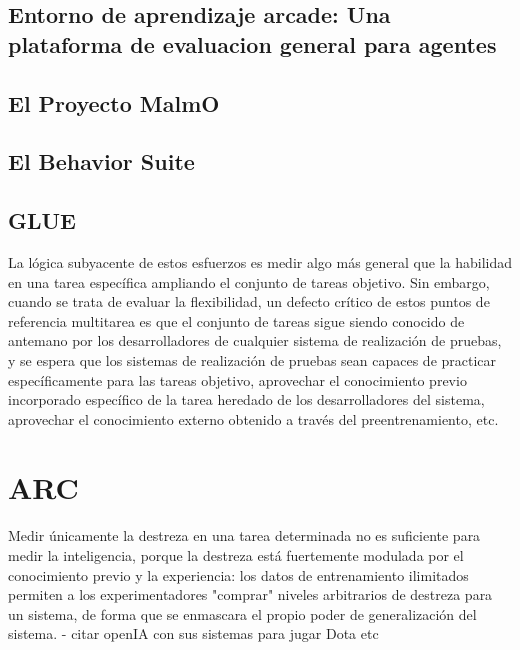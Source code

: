 \subsection{Entorno de aprendizaje arcade:
Una plataforma de evaluacion general para agentes}\label{subsection:state-of-the-art:evaluation-enviroments-with-know-tasks:arcade-enviroment}

\subsection{El Proyecto MalmO}\label{subsection:state-of-the-art:evaluation-enviroments-with-know-tasks:project-malmO}

\subsection{El Behavior Suite}\label{subsection:state-of-the-art:evaluation-enviroments-with-know-tasks:bsuite}

\subsection{GLUE}\label{subsection:state-of-the-art:evaluation-enviroments-with-know-tasks:the-glue}


La lógica subyacente de estos esfuerzos es medir algo más general que la habilidad en una tarea específica ampliando el conjunto de tareas objetivo. Sin embargo, cuando se trata de evaluar la flexibilidad, un defecto crítico de estos puntos de referencia multitarea es que el conjunto de tareas sigue siendo conocido de antemano por los desarrolladores de cualquier sistema de realización de pruebas, y se espera que los sistemas de realización de pruebas sean capaces de practicar específicamente para las tareas objetivo, aprovechar el conocimiento previo incorporado específico de la tarea heredado de los desarrolladores del sistema, aprovechar el conocimiento externo obtenido a través del preentrenamiento, etc.

\section{ARC}\label{section:state-of-the-art:arc}

Medir únicamente la destreza en una tarea determinada no es suficiente para medir la inteligencia, porque la destreza está fuertemente modulada por el conocimiento previo y la experiencia: los datos de entrenamiento ilimitados permiten a los experimentadores "comprar" niveles arbitrarios de destreza para un sistema, de forma que se enmascara el propio poder de generalización del sistema.
- citar openIA con sus sistemas para jugar Dota etc